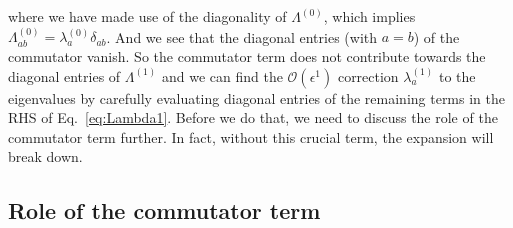 %
where we have made use of the diagonality of $\Lambda^{(0)}$, which implies $\Lambda^{(0)}_{ab} = \lambda^{(0)}_{a}\delta_{ab}$.
And we see that the diagonal entries (with $a=b$) of the commutator vanish.
So the commutator term does not contribute towards the diagonal entries of $\Lambda^{(1)}$ and we can find the $\mathcal{O}(\epsilon^{1})$ correction $\lambda^{(1)}_{a}$ to the eigenvalues by carefully evaluating diagonal entries of the remaining terms in the RHS of Eq.~\eqref{eq:Lambda1}.
Before we do that, we need to discuss the role of the commutator term further.
In fact, without this crucial term, the expansion will break down.

\subsection{Role of the commutator term}

